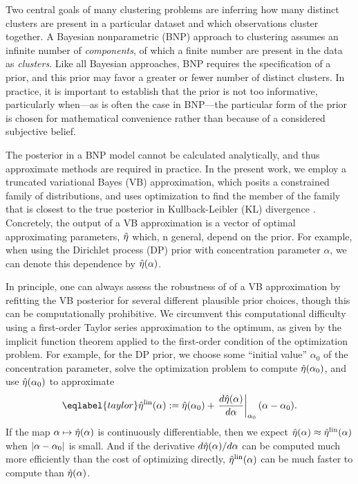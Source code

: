 Two central goals of many clustering problems are inferring how many distinct
clusters are present in a particular dataset and which observations cluster
together. A Bayesian nonparametric (BNP) approach to clustering assumes an
infinite number of \textit{components}, of which a finite number are present in
the data as \textit{clusters}. Like all Bayesian approaches, BNP requires the
specification of a prior, and this prior may favor a greater or fewer number of
distinct clusters. In practice, it is important to establish that the prior is
not too informative, particularly when---as is often the case in BNP---the
particular form of the prior is chosen for mathematical convenience rather than
because of a considered subjective belief.

The posterior in a BNP model cannot be calculated analytically, and thus
approximate methods are required in practice. In the present work, we employ a
truncated variational Bayes (VB) approximation, which posits a constrained
family of distributions, and uses optimization to find the member of the family
that is closest to the true posterior in Kullback-Leibler ($\mathrm{KL}$)
divergence \citep{blei:2017:vi_review, blei:2006:vi_for_dp}. Concretely, the
output of a VB approximation is a vector of optimal approximating parameters,
$\hat\eta$ which, n general, depend on the prior.  For example, when using the
Dirichlet process (DP) prior with concentration parameter $\alpha$, we can
denote this dependence by $\hat\eta(\alpha)$.

In principle, one can always assess the robustness of of a VB approximation by
refitting the VB posterior for several different plausible prior choices, though
this can be computationally prohibitive. We circumvent this computational
difficulty using a first-order Taylor series approximation to the optimum, as
given by the implicit function theorem applied to the first-order condition of
the optimization problem. For example, for the DP prior, we choose some
``initial value'' $\alpha_0$ of the concentration parameter, solve the
optimization problem to compute $\hat\eta(\alpha_0)$, and use $\hat\eta(\alpha_0)$
to approximate
%
\begin{align}\eqlabel{taylor}
%
\etalin(\alpha) :=
    \etaopt(\alpha_0) +
    \fracat{d\etaopt(\alpha)}{d\alpha}{\alpha_0} (\alpha - \alpha_0).
%
\end{align}
%
If the map $\alpha \mapsto \hat\eta(\alpha)$ is continuously differentiable, then
we expect $\hat\eta(\alpha) \approx \hat\eta^{\mathrm{lin}}(\alpha)$ when $\left|\alpha -
\alpha_0\right|$ is small.  And if the derivative $d\hat\eta(\alpha) / d\alpha$ can be
computed much more efficiently than the cost of optimizing directly,
$\hat\eta^{\mathrm{lin}}(\alpha)$ can be much faster to compute than $\hat\eta(\alpha)$.


